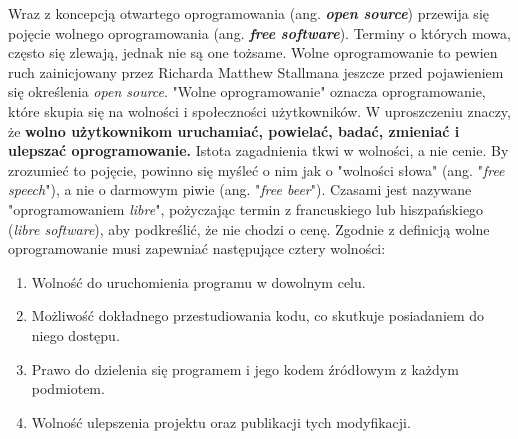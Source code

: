 \documentclass{article}
\begin{document}
\hspace{4mm} Wraz z koncepcją otwartego oprogramowania (ang. \textbf{\emph{open source}}) przewija się pojęcie wolnego oprogramowania (ang. \textbf{\emph{free software}}). Terminy o których mowa, często się zlewają, jednak nie są one tożsame. Wolne oprogramowanie to pewien ruch zainicjowany przez Richarda Matthew Stallmana jeszcze przed pojawieniem się określenia \emph{open source}. "Wolne oprogramowanie" oznacza oprogramowanie, które skupia się na wolności i społeczności użytkowników. W uproszczeniu znaczy, że \textbf{wolno użytkownikom uruchamiać, powielać, badać, zmieniać i ulepszać oprogramowanie.} Istota zagadnienia tkwi w wolności, a nie cenie. By zrozumieć to pojęcie, powinno się myśleć o nim jak o "wolności słowa" (ang. "\emph{free speech}"), a nie o darmowym piwie (ang. "\emph{free beer}"). Czasami jest nazywane "oprogramowaniem \emph{libre}", pożyczając termin z francuskiego lub hiszpańskiego (\emph{libre software}), aby podkreślić, że nie chodzi o cenę\cite{gnu.free}. Zgodnie z definicją wolne oprogramowanie musi zapewniać następujące cztery wolności\cite{Webbink}:

\begin{enumerate}
    \item Wolność do uruchomienia programu w dowolnym celu.
    \item Możliwość dokładnego przestudiowania kodu, co skutkuje posiadaniem do niego dostępu.
    \item Prawo do dzielenia się programem i jego kodem źródłowym z każdym podmiotem.
    \item Wolność ulepszenia projektu oraz publikacji tych modyfikacji. 
\end{enumerate}
\end{document}
